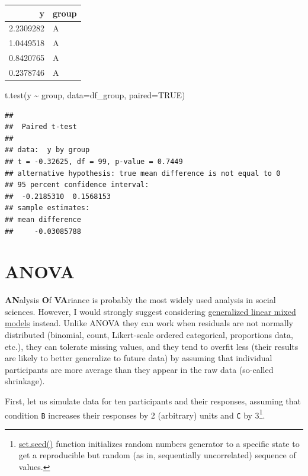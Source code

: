 \documentclass[
]{book}
\newenvironment{Shaded}{\begin{snugshade}}{\end{snugshade}}
\newcommand{\AttributeTok}[1]{\textcolor[rgb]{0.77,0.63,0.00}{#1}}
\newcommand{\ConstantTok}[1]{\textcolor[rgb]{0.00,0.00,0.00}{#1}}
\newcommand{\FunctionTok}[1]{\textcolor[rgb]{0.00,0.00,0.00}{#1}}
\newcommand{\NormalTok}[1]{#1}
\newcommand{\SpecialCharTok}[1]{\textcolor[rgb]{0.00,0.00,0.00}{#1}}
\begin{document}
\begin{tabular}{r|l}
\hline
y & group\\
\hline
2.2309282 & A\\
\hline
1.0449518 & A\\
\hline
0.8420765 & A\\
\hline
0.2378746 & A\\
\hline
\end{tabular}

\begin{Shaded}
\begin{Highlighting}[]
\FunctionTok{t.test}\NormalTok{(y }\SpecialCharTok{\textasciitilde{}}\NormalTok{ group, }\AttributeTok{data=}\NormalTok{df\_group, }\AttributeTok{paired=}\ConstantTok{TRUE}\NormalTok{)}
\end{Highlighting}
\end{Shaded}

\begin{verbatim}
## 
##  Paired t-test
## 
## data:  y by group
## t = -0.32625, df = 99, p-value = 0.7449
## alternative hypothesis: true mean difference is not equal to 0
## 95 percent confidence interval:
##  -0.2185310  0.1568153
## sample estimates:
## mean difference 
##     -0.03085788
\end{verbatim}

\hypertarget{anova}{%
\section{ANOVA}\label{anova}}

\textbf{AN}alysis \textbf{O}f \textbf{VA}riance is probably the most widely used analysis in social sciences. However, I would strongly suggest considering \protect\hyperlink{GLMM}{generalized linear mixed models} instead. Unlike ANOVA they can work when residuals are not normally distributed (binomial, count, Likert-scale ordered categorical, proportions data, etc.), they can tolerate missing values, and they tend to overfit less (their results are likely to better generalize to future data) by assuming that individual participants are more average than they appear in the raw data (so-called shrinkage).

First, let us simulate data for ten participants and their responses, assuming that condition \texttt{B} increases their responses by 2 (arbitrary) units and \texttt{C} by 3\footnote{\href{https://stat.ethz.ch/R-manual/R-devel/library/base/html/Random.html}{set.seed()} function initializes random numbers generator to a specific state to get a reproducible but random (as in, sequentially uncorrelated) sequence of values.}.
\end{document}
